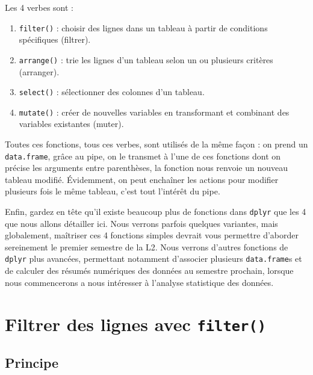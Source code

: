 \documentclass[
  letterpaper,
  DIV=11,
  numbers=noendperiod]{scrreprt}
\providecommand{\tightlist}{%
  \setlength{\itemsep}{0pt}\setlength{\parskip}{0pt}}\usepackage{longtable,booktabs,array}
\begin{document}
Les 4 verbes sont :

\begin{enumerate}
\def\labelenumi{\arabic{enumi}.}
\tightlist
\item
  \texttt{filter()} : choisir des lignes dans un tableau à partir de
  conditions spécifiques (filtrer).
\item
  \texttt{arrange()} : trie les lignes d'un tableau selon un ou
  plusieurs critères (arranger).
\item
  \texttt{select()} : sélectionner des colonnes d'un tableau.
\item
  \texttt{mutate()} : créer de nouvelles variables en transformant et
  combinant des variables existantes (muter).
\end{enumerate}

Toutes ces fonctions, tous ces verbes, sont utilisés de la même façon :
on prend un \texttt{data.frame}, grâce au pipe, on le transmet à l'une
de ces fonctions dont on précise les arguments entre parenthèses, la
fonction nous renvoie un nouveau tableau modifié. Évidemment, on peut
enchaîner les actions pour modifier plusieurs fois le même tableau,
c'est tout l'intérêt du pipe.

Enfin, gardez en tête qu'il existe beaucoup plus de fonctions dans
\texttt{dplyr} que les 4 que nous allons détailler ici. Nous verrons
parfois quelques variantes, mais globalement, maîtriser ces 4 fonctions
simples devrait vous permettre d'aborder sereinement le premier semestre
de la L2. Nous verrons d'autres fonctions de \texttt{dplyr} plus
avancées, permettant notamment d'associer plusieurs \texttt{data.frame}s
et de calculer des résumés numériques des données au semestre prochain,
lorsque nous commencerons a nous intéresser à l'analyse statistique des
données.

\hypertarget{filtrer-des-lignes-avec-filter}{%
\section{\texorpdfstring{Filtrer des lignes avec
\texttt{filter()}}{Filtrer des lignes avec filter()}}\label{filtrer-des-lignes-avec-filter}}

\hypertarget{principe}{%
\subsection{Principe}\label{principe}}
\end{document}
